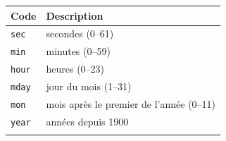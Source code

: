\documentclass[
  11pt,
]{book}
\numberwithin{equation}{section}
\numberwithin{countremarque}{section}
\begin{document}
\begin{longtable}[]{@{}ll@{}}
\toprule
\begin{minipage}[b]{0.19\columnwidth}\raggedright
Code\strut
\end{minipage} & \begin{minipage}[b]{0.75\columnwidth}\raggedright
Description\strut
\end{minipage}\tabularnewline
\midrule
\endhead
\begin{minipage}[t]{0.19\columnwidth}\raggedright
\texttt{sec}\strut
\end{minipage} & \begin{minipage}[t]{0.75\columnwidth}\raggedright
secondes (0--61)\strut
\end{minipage}\tabularnewline
\begin{minipage}[t]{0.19\columnwidth}\raggedright
\texttt{min}\strut
\end{minipage} & \begin{minipage}[t]{0.75\columnwidth}\raggedright
minutes (0--59)\strut
\end{minipage}\tabularnewline
\begin{minipage}[t]{0.19\columnwidth}\raggedright
\texttt{hour}\strut
\end{minipage} & \begin{minipage}[t]{0.75\columnwidth}\raggedright
heures (0--23)\strut
\end{minipage}\tabularnewline
\begin{minipage}[t]{0.19\columnwidth}\raggedright
\texttt{mday}\strut
\end{minipage} & \begin{minipage}[t]{0.75\columnwidth}\raggedright
jour du mois (1--31)\strut
\end{minipage}\tabularnewline
\begin{minipage}[t]{0.19\columnwidth}\raggedright
\texttt{mon}\strut
\end{minipage} & \begin{minipage}[t]{0.75\columnwidth}\raggedright
mois après le premier de l'année (0--11)\strut
\end{minipage}\tabularnewline
\begin{minipage}[t]{0.19\columnwidth}\raggedright
\texttt{year}\strut
\end{minipage} & \begin{minipage}[t]{0.75\columnwidth}\raggedright
années depuis 1900\strut
\end{minipage}\tabularnewline
\begin{minipage}[t]{0.19\columnwidth}\raggedright

\end{minipage}
\end{longtable}
\end{document}
